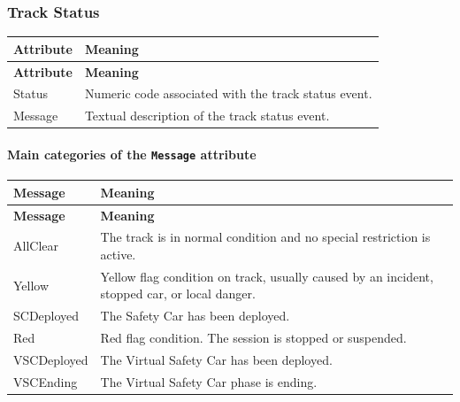 \documentclass[a4paper,11pt]{article}
\begin{document}
	
	
	\subsubsection{Track Status}
	
	
	
	\begin{longtable}{|p{4cm}|p{10.8cm}|}
		\hline
		\textbf{Attribute} & \textbf{Meaning} \\
		\hline
		\endfirsthead
		
		\hline
		\textbf{Attribute} & \textbf{Meaning} \\
		\hline
		\endhead
		
		Status & Numeric code associated with the track status event. \\ \hline
		
		Message & Textual description of the track status event. \\ \hline
	\end{longtable}
	
	\paragraph*{Main categories of the \texttt{Message} attribute}
	
	\begin{longtable}{|p{4.2cm}|p{10.6cm}|}
		\hline
		\textbf{Message} & \textbf{Meaning} \\
		\hline
		\endfirsthead
		
		\hline
		\textbf{Message} & \textbf{Meaning} \\
		\hline
		\endhead
		
		AllClear & The track is in normal condition and no special restriction is active. \\ \hline
		
		Yellow & Yellow flag condition on track, usually caused by an incident, stopped car, or local danger. \\ \hline
		
		SCDeployed & The Safety Car has been deployed. \\ \hline
		
		Red & Red flag condition. The session is stopped or suspended. \\ \hline
		
		VSCDeployed & The Virtual Safety Car has been deployed. \\ \hline
		
		VSCEnding & The Virtual Safety Car phase is ending. \\ \hline
	\end{longtable}
	
\end{document}

